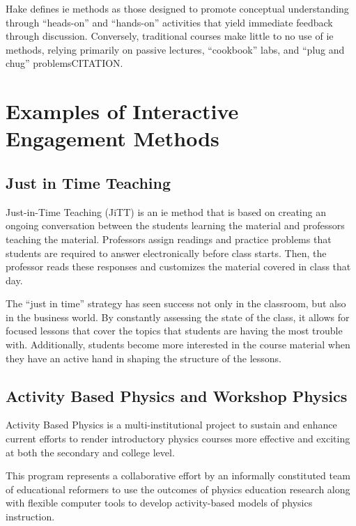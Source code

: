 Hake defines \gls{ie} methods as those designed to promote conceptual understanding through ``heads-on'' and ``hands-on'' activities that yield immediate feedback through discussion. Conversely, traditional courses make little to no use of \gls{ie} methods, relying primarily on passive lectures, ``cookbook'' labs, and ``plug and chug'' problemsCITATION.

\section{Examples of Interactive Engagement Methods}

\subsection*{Just in Time Teaching}

Just-in-Time Teaching (JiTT) is an \gls{ie} method that is based on creating an ongoing conversation between the students learning the material and professors teaching the material. Professors assign readings and practice problems that students are required to answer electronically before class starts. Then, the professor reads these responses and customizes the material covered in class that day\cite{novak1999}.

The ``just in time'' strategy has seen success not only in the classroom, but also in the business world. By constantly assessing the state of the class, it allows for focused lessons that cover the topics that students are having the most trouble with. Additionally, students become more interested in the course material when they have an active hand in shaping the structure of the lessons.

\subsection*{Activity Based Physics and Workshop Physics}

Activity Based Physics is a multi-institutional project to sustain and enhance current efforts to render introductory physics courses more effective and exciting at both the secondary and college level.

This program represents a collaborative effort by an informally constituted team of educational reformers to use the outcomes of physics education research along with flexible computer tools to develop activity-based models of physics instruction.

